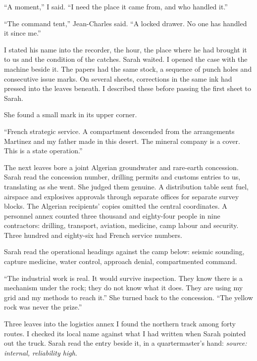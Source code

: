 ``A moment,'' I said. ``I need the place it came from, and who handled it.''\par

``The command tent,'' Jean-Charles said. ``A locked drawer. No one has handled it since me.''\par

I stated his name into the recorder, the hour, the place where he had brought it to us and the condition of the catches. Sarah waited. I opened the case with the machine beside it. The papers had the same stock, a sequence of punch holes and consecutive issue marks. On several sheets, corrections in the same ink had pressed into the leaves beneath. I described these before passing the first sheet to Sarah.\par

She found a small mark in its upper corner.\par

``French strategic service. A compartment descended from the arrangements Martinez and my father made in this desert. The mineral company is a cover. This is a state operation.''\par

The next leaves bore a joint Algerian groundwater and rare-earth concession. Sarah read the concession number, drilling permits and customs entries to us, translating as she went. She judged them genuine. A distribution table sent fuel, airspace and explosives approvals through separate offices for separate survey blocks. The Algerian recipients' copies omitted the central coordinates. A personnel annex counted three thousand and eighty-four people in nine contractors: drilling, transport, aviation, medicine, camp labour and security. Three hundred and eighty-six had French service numbers.\par

Sarah read the operational headings against the camp below: seismic sounding, capture medicine, water control, approach denial, compartmented command.\par

``The industrial work is real. It would survive inspection. They know there is a mechanism under the rock; they do not know what it does. They are using my grid and my methods to reach it.'' She turned back to the concession. ``The yellow rock was never the prize.''\par

Three leaves into the logistics annex I found the northern track among forty routes. I checked its local name against what I had written when Sarah pointed out the truck. Sarah read the entry beside it, in a quartermaster's hand: \emph{source: internal, reliability high}.\par

